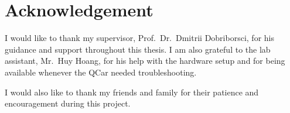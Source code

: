
\thispagestyle{empty}
\chapter*{Acknowledgement}

I would like to thank my supervisor, Prof.\ Dr.\ Dmitrii Dobriborsci, for his guidance and support throughout this thesis. I am also grateful to the lab assistant, Mr.\ Huy Hoang, for his help with the hardware setup and for being available whenever the QCar needed troubleshooting.

I would also like to thank my friends and family for their patience and encouragement during this project.
